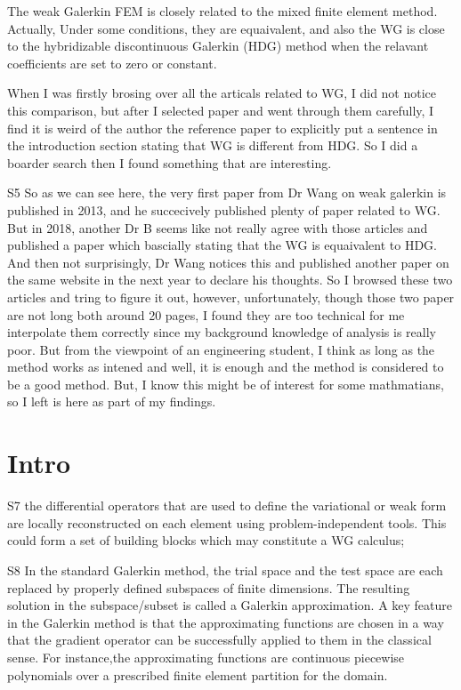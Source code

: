 \documentclass[17pt]{extarticle} %
\begin{document}
The weak Galerkin FEM is closely related to the mixed finite element method. Actually, Under some conditions, 
they are equaivalent, and also the WG is close to the hybridizable discontinuous
Galerkin (HDG) method when the relavant coefficients are set to zero or constant. 

When I was firstly brosing over all the articals related to WG, I did not notice this comparison, but after I selected
paper and went through them carefully, I find it is weird of the author the reference paper to explicitly put a sentence in
the introduction section stating that WG is different from HDG. So I did a boarder search then I found something that are 
interesting. 

S5
So as we can see here, the very first paper from Dr Wang on weak galerkin is published in 2013, and he succecively published 
plenty of paper related to WG. But in 2018, another Dr B seems like not really agree with those articles and published a paper
which bascially stating that the WG is equaivalent to HDG. And then not surprisingly, Dr Wang notices this and published another
paper on the same website in the next year to declare his thoughts. So I browsed these two articles and tring to figure it out, however, unfortunately,
though those two paper are not long both around 20 pages, I found they are too technical for me interpolate them correctly since my
background knowledge of analysis is really poor. But from the viewpoint of an engineering student, I think as long as the method 
works as intened and well, it is enough and the method is considered to be a good method. But, I know this might be of interest
for some mathmatians, so I left is here as part of my findings.


\section*{Intro}

S7
the differential operators that are used to define the variational or weak form are locally reconstructed on each element using
problem-independent tools. This could form a set of building blocks which may
constitute a WG calculus;

S8
In the standard Galerkin method, the trial space and the test space are each replaced by properly 
defined subspaces of finite dimensions. The resulting solution in the subspace/subset is
called a Galerkin approximation. A key feature in the Galerkin method is that the approximating 
functions are chosen in a way that the gradient operator can be successfully applied to them 
in the classical sense. For instance,the approximating functions are continuous piecewise polynomials 
over a prescribed finite element partition for the domain. 
\end{document}
